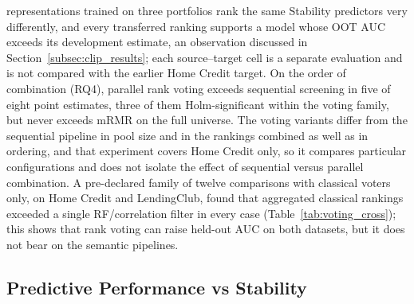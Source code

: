 \documentclass[final,5p,twocolumn]{elsarticle}
\begin{document}
representations trained on three portfolios rank the same Stability predictors very differently, and every transferred ranking supports a model whose OOT AUC exceeds its development estimate, an observation discussed in Section~\ref{subsec:clip_results}; each source--target cell is a separate evaluation and is not compared with the earlier Home Credit target. On the order of combination (RQ4), parallel rank voting exceeds sequential screening in five of eight point estimates, three of them Holm-significant within the voting family, but never exceeds mRMR on the full universe. The voting variants differ from the sequential pipeline in pool size and in the rankings combined as well as in ordering, and that experiment covers Home Credit only, so it compares particular configurations and does not isolate the effect of sequential versus parallel combination. A pre-declared family of twelve comparisons with classical voters only, on Home Credit and LendingClub, found that aggregated classical rankings exceeded a single RF/correlation filter in every case (Table~\ref{tab:voting_cross}); this shows that rank voting can raise held-out AUC on both datasets, but it does not bear on the semantic pipelines.

\subsection{Predictive Performance vs Stability}
\label{subsec:performance_vs_stability}
\end{document}
